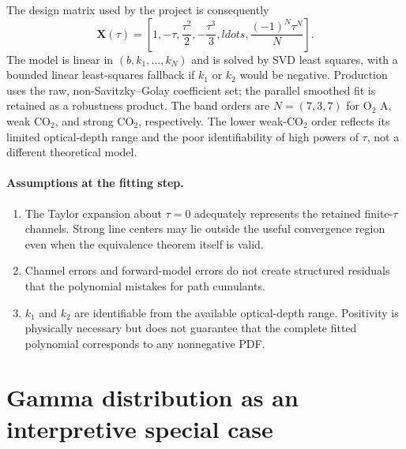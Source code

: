 \documentclass[11pt]{article}
\begin{document}
The design matrix used by the project is consequently
\begin{equation}
  \bm X(\tau)
  = \left[1,-\tau,\frac{\tau^2}{2},-\frac{\tau^3}{3},ldots,
           \frac{(-1)^N\tau^N}{N}\right].
  \label{eq:design}
\end{equation}
The model is linear in $(b,k_1,\ldots,k_N)$ and is solved by SVD least squares,
with a bounded linear least-squares fallback if $k_1$ or $k_2$ would be
negative.  Production uses the raw, non-Savitzky--Golay coefficient set; the
parallel smoothed fit is retained as a robustness product.  The band orders are
$N=(7,3,7)$ for O$_2$ A, weak CO$_2$, and strong CO$_2$, respectively.  The
lower weak-CO$_2$ order reflects its limited optical-depth range and the poor
identifiability of high powers of $\tau$, not a different theoretical model.

\paragraph{Assumptions at the fitting step.}
\begin{enumerate}
  \item The Taylor expansion about $\tau=0$ adequately represents the retained
        finite-$\tau$ channels.  Strong line centers may lie outside the useful
        convergence region even when the equivalence theorem itself is valid.
  \item Channel errors and forward-model errors do not create structured
        residuals that the polynomial mistakes for path cumulants.
  \item $k_1$ and $k_2$ are identifiable from the available optical-depth
        range.  Positivity is physically necessary but does not guarantee that
        the complete fitted polynomial corresponds to any nonnegative PDF.
\end{enumerate}

\section{Gamma distribution as an interpretive special case}
\end{document}

